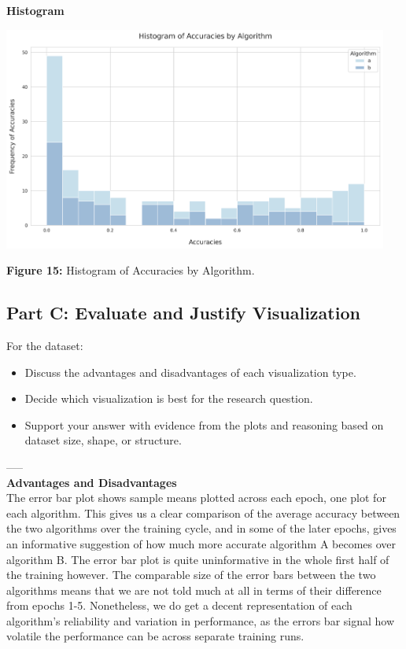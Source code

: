 \textbf{Histogram}
\begin{center}
  \includegraphics[width=0.95\textwidth]{figures/algo_accuracy_by_epoch_histogram_plot.png}
  
  \textbf{Figure 15:} Histogram of Accuracies by Algorithm.
\end{center}
\newpage

\subsection{Part C: Evaluate and Justify Visualization}
For the dataset:
\begin{itemize}
    \item Discuss the advantages and disadvantages of each visualization type.
    \item Decide which visualization is best for the research question.
    \item Support your answer with evidence from the plots and reasoning based on dataset size, shape, or structure.
\end{itemize}
-----\\
\textbf{Advantages and Disadvantages}\\
The error bar plot shows sample means plotted across each epoch, one plot for each algorithm. This gives us a clear comparison of the average accuracy between the two algorithms over the training cycle, and in some of the later epochs, gives an informative suggestion of how much more accurate algorithm A becomes over algorithm B. The error bar plot is quite uninformative in the whole first half of the training however. The comparable size of the error bars between the two algorithms means that we are not told much at all in terms of their difference from epochs 1-5. Nonetheless, we do get a decent representation of each algorithm's reliability and variation in performance, as the errors bar signal how volatile the performance can be across separate training runs.\\

